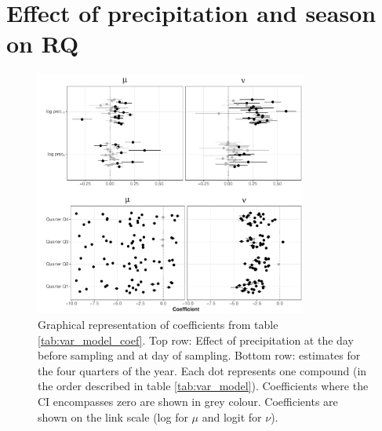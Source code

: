 \documentclass[pdftex,
	a4paper,
	titlepage=false]{scrreprt}
\begin{document}
\chapter{Effect of precipitation and season on RQ}


\newpage


\begin{figure}[ht]
	\centering
	\includegraphics[width = 0.8\textwidth]{coefs}
	\caption[Graphical representation of coefficients from table \ref{tab:var_model_coef}.]{Graphical representation of coefficients from table \ref{tab:var_model_coef}. Top row: Effect of precipitation at the day before sampling and at day of sampling. Bottom row: estimates for the four quarters of the year. Each dot represents one compound (in the order described in table \ref{tab:var_model}). Coefficients where the CI encompasses zero are shown in grey colour. Coefficients are shown on the link scale (log for $\mu$ and logit for $\nu$).}
	\label{fig:coefs}
\end{figure}
\end{document}
